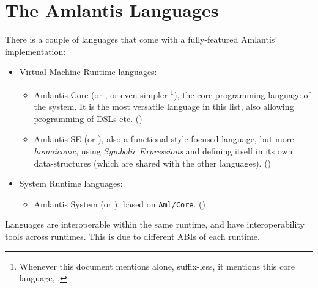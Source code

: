 \section*{The Amlantis Languages}
\label{sec:amlantis-languages}

There is a couple of languages that come with a fully-featured Amlantis' implementation:

\begin{itemize}
  \item Virtual Machine Runtime languages:
    \begin{itemize}
      \item Amlantis Core (or \AmlCore, or even simpler \Aml\footnote{Whenever this document mentions \Aml alone, suffix-less, it mentions this core language, \AmlCore.}), the core programming language of the system. It is the most versatile language in this list, also allowing programming of DSLs etc. ()
      \item Amlantis SE (or \AmlSE), also a functional-style focused language, but more {\em homoiconic}, using {\em Symbolic Expressions} and defining itself in its own data-structures (which are shared with the other  languages). ()
    \end{itemize}
  \item System Runtime languages:
    \begin{itemize}
      \item Amlantis System (or \AmlSystem), based on \mbox{\lstinline!Aml/Core!}. ()
    \end{itemize}
\end{itemize}

Languages are interoperable within the same runtime, and have interoperability tools across runtimes. This is due to different ABIs of each runtime. 







